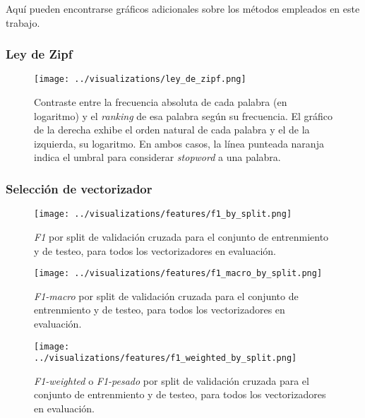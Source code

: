 Aquí pueden encontrarse gráficos adicionales sobre los métodos empleados
en este trabajo.

\subsubsection{Ley de Zipf}
\label{appendix-plots-zipf-law}

\begin{figure}[!htb]
    \centering
    \texttt{[image: ../visualizations/ley\_de\_zipf.png]}
    \caption{Contraste entre la frecuencia absoluta de cada palabra (en logaritmo)
    y el \textit{ranking} de esa palabra según su frecuencia. El gráfico de la
    derecha exhibe el orden natural de cada palabra y el de la izquierda, su logaritmo.
    En ambos casos, la línea punteada naranja indica el umbral
    para considerar \textit{stopword} a una palabra.}
    \label{fig-zipf-law}
\end{figure}
\FloatBarrier

\subsubsection{Selección de vectorizador}
\label{appendix-plots-vectorizers}

\begin{figure}[!htb]
    \centering
    \texttt{[image: ../visualizations/features/f1\_by\_split.png]}
    \caption{\textit{F1} por split de validación cruzada para el conjunto
    de entrenmiento y de testeo, para todos los vectorizadores en evaluación.}
    \label{fig-vectorizers-f1}
\end{figure}
\FloatBarrier

\begin{figure}[!htb]
    \centering
    \texttt{[image: ../visualizations/features/f1\_macro\_by\_split.png]}
    \caption{\textit{F1-macro} por split de validación cruzada para el conjunto
    de entrenmiento y de testeo, para todos los vectorizadores en evaluación.}
    \label{fig-vectorizers-f1-macro}
\end{figure}
\FloatBarrier

\begin{figure}[!htb]
    \centering
    \texttt{[image: ../visualizations/features/f1\_weighted\_by\_split.png]}
    \caption{\textit{F1-weighted} o \textit{F1-pesado} por split de validación
    cruzada para el conjunto de entrenmiento y de testeo, para todos los
    vectorizadores en evaluación.}
    \label{fig-vectorizers-f1-weighted}
\end{figure}
\FloatBarrier

